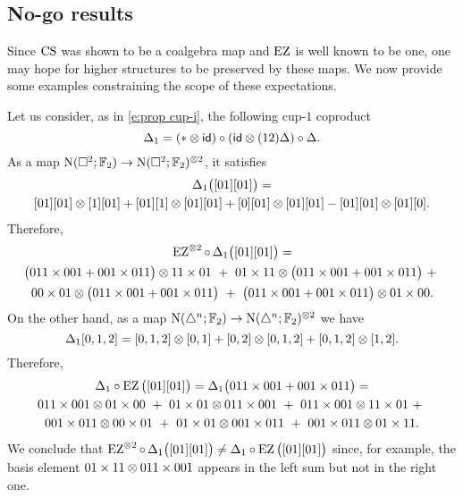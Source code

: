\subsection{No-go results}

Since $\operatorname{CS}$ was shown to be a coalgebra map and $\operatorname{EZ}$ is well known to be one, one may hope for higher structures to be preserved by these maps.
We now provide some examples constraining the scope of these expectations.

\begin{example*}
	Let us consider, as in \cref{e:prop cup-i}, the following cup-$1$ coproduct
	\[
	\Delta_1 = (\ast \otimes \mathsf{id}) \circ (\mathsf{id} \otimes (12) \Delta) \circ \Delta.
	\]
	As a map $\operatorname{N}(\square^2; {\mathbb{F}_2}) \to \operatorname{N}(\square^2; {\mathbb{F}_2})^{\otimes 2}$, it satisfies
	\begin{multline*}
		\Delta_1 \big( [01] [01] \big) = \\
		[01][01] \otimes [1][01] + [01][1] \otimes [01][01] + [0][01] \otimes [01][01] - [01][01] \otimes [01][0].
	\end{multline*}
	Therefore,
	\begin{multline*}
		\operatorname{EZ}^{\otimes 2} \circ \, \Delta_1 \big( [01][01] \big) = \\
		\big( 011\times001 + 001\times011 \big) \otimes 11 \times 01 \ +\
		01\times11 \otimes \big( 011\times001 + 001\times011 \big) \ +\ \\
		00\times01 \otimes \big( 011\times001 + 001\times011 \big) \ +\
		\big( 011\times001 + 001\times011 \big) \otimes 01\times00.
	\end{multline*}
	On the other hand, as a map $\operatorname{N}(\triangle^n; {\mathbb{F}_2}) \to \operatorname{N}(\triangle^n; {\mathbb{F}_2})^{\otimes 2}$ we have
	\[
	\Delta_1 [0,1,2] = [0,1,2] \otimes [0,1] + [0,2] \otimes [0,1,2] + [0,1,2] \otimes [1,2].
	\]
	Therefore,
	\begin{multline*}
		\Delta_1 \circ \operatorname{EZ} \big( [01] [01] \big) = \Delta_1 \big( 011\times001 + 001\times011 \big) = \\
		011\times001 \otimes 01\times00 \ + \
		01\times01 \otimes 011\times001 \ + \
		011\times001 \otimes 11\times01 \ + \ \\
		001\times011 \otimes 00\times01 \ + \
		01\times01 \otimes 001\times011 \ + \
		001\times011 \otimes 01\times11.
	\end{multline*}
	We conclude that $\operatorname{EZ}^{\otimes 2} \circ \, \Delta_1 \big( [01][01] \big) \neq \Delta_1 \circ \operatorname{EZ} \big( [01] [01] \big)$ since, for example, the basis element $01\times11 \otimes 011\times001$ appears in the left sum but not in the right one.
\end{example*}

